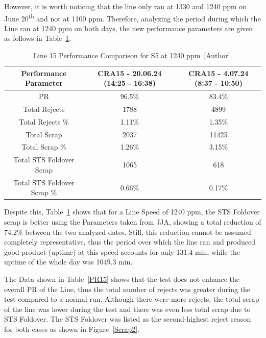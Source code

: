 However, it is worth noticing that the line only ran at 1330 and 1240 ppm on June 20\textsuperscript{th} and not at 1100 ppm. Therefore, analyzing the period during which the Line ran at 1240 ppm on both days, the new performance parameters are given as follows in Table~\ref{PR15-2}.

\begin{table}[H]
\centering
\scriptsize
\begin{tabular}{ccc}
\hline
\textbf{Performance Parameter} & \textbf{CRA15 - 20.06.24 (14:25 - 16:38)} & \textbf{CRA15 - 4.07.24 (8:37 - 10:50)} \\ \hline
PR                           & 96.5\% & 83.4\% \\
Total Rejects                & 1788   & 4899   \\
Total Rejects \%            & 1.11\% & 1.35\% \\
Total Scrap                  & 2037   & 11425  \\
Total Scrap \%              & 1.26\% & 3.15\% \\
Total STS Foldover Scrap     & 1065   & 618    \\
Total STS Foldover Scrap \% & 0.66\% & 0.17\% \\ \hline
\end{tabular}%
\caption{Line 15 Performance Comparison for  S5 at 1240 ppm~[Author].}
\label{PR15-2}
\end{table}

Despite this, Table~\ref{PR15-2} shows that for a Line Speed of 1240 ppm, the STS Foldover scrap is better using the Parameters taken from JJA, showing a total reduction of 74.2\% between the two analyzed dates. Still, this reduction cannot be assumed completely representative, thus the period over which the line ran and produced good product (uptime) at this speed accounts for only 131.4 min, while the uptime of the whole day was 1049.3 min.

The Data shown in Table~\ref{PR15} shows that the test does not enhance the overall PR of the Line, thus the total number of rejects was greater during the test compared to a normal run. Although there were more rejects, the total scrap of the line was lower during the test and there was even less total scrap due to STS Foldover. The STS Foldover was listed as the second-highest reject reason for both cases as shown in Figure~\ref{Scrap2}.

